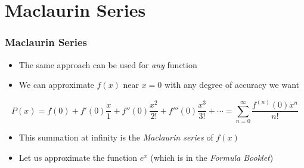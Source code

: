 \documentclass{beamer}
\begin{document}
\section{Maclaurin Series}

\begin{frame}
  \frametitle{Maclaurin Series}
  \begin{itemize}
    \item The same approach can be used for \textit{any} function
    \item We can approximate \( f(x) \) near \( x = 0 \) with any degree of accuracy we want
  \end{itemize}
  \begin{equation*}
    P(x) = f(0) + f'(0)\frac{x}{1} + f''(0)\frac{x^2}{2!} + f'''(0)\frac{x^3}{3!} + \cdots = \sum_{n = 0}^{\infty} \frac{f^{(n)}(0)x^n}{n!}
  \end{equation*}
  \begin{itemize}
    \item This summation at infinity is the \textit{Maclaurin series} of \( f(x) \)
    \item Let us approximate the function \( e^x \) (which is in the \textit{Formula Booklet})
  \end{itemize} %
\end{frame}

\end{document}
